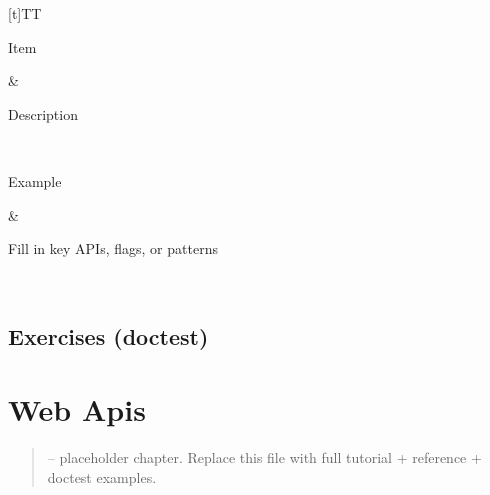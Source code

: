 \documentclass[a4paper,11pt,english]{sphinxmanual}
\begin{document}
\begin{savenotes}\sphinxattablestart
\sphinxthistablewithglobalstyle
\centering
\begin{tabulary}{\linewidth}[t]{TT}
\sphinxtoprule
\begin{varwidth}[t]{}
\sphinxstyletheadfamily \sphinxAtStartPar
Item
\sphinxbeforeendvarwidth
\end{varwidth}%
&\begin{varwidth}[t]{}
\sphinxstyletheadfamily \sphinxAtStartPar
Description
\sphinxbeforeendvarwidth
\end{varwidth}%
\\
\sphinxmidrule
\sphinxtableatstartofbodyhook\begin{varwidth}[t]{}
\sphinxAtStartPar
Example
\sphinxbeforeendvarwidth
\end{varwidth}%
&\begin{varwidth}[t]{}
\sphinxAtStartPar
Fill in key APIs, flags, or patterns
\sphinxbeforeendvarwidth
\end{varwidth}%
\\
\sphinxbottomrule
\end{tabulary}
\sphinxtableafterendhook\par
\sphinxattableend\end{savenotes}


\subsection{Exercises (doctest)}
\label{\detokenize{third_party/devops:exercises-doctest}}
\begin{sphinxVerbatim}[commandchars=\\\{\}]
\end{sphinxVerbatim}

\sphinxstepscope


\section{Web Apis}
\label{\detokenize{third_party/web_apis:web-apis}}\label{\detokenize{third_party/web_apis::doc}}\begin{quote}

\sphinxAtStartPar
{} – placeholder chapter. Replace this file with full tutorial + reference + doctest examples.
\end{quote}
\end{document}
